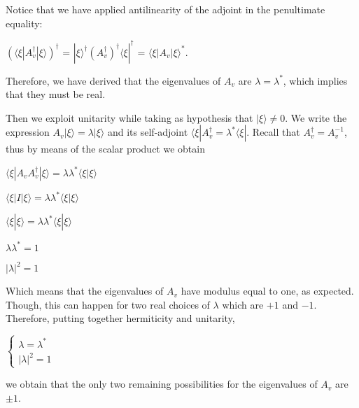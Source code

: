 \documentclass{Configuration_Files/PoliMi3i_thesis}
\begin{document}
Notice that we have applied antilinearity of the adjoint in the penultimate equality: 

\begin{center}
	$(\langle \xi|A_v^{\dagger}|\xi \rangle)^{\dagger}$ = $|\xi\rangle^{\dagger} (A_v^{\dagger})^{\dagger} \langle\xi|^{\dagger}$ = $\langle \xi|A_v|\xi \rangle^*$.  
\end{center}

Therefore, we have derived that the eigenvalues of $A_v$ are $\lambda = \lambda^*$, which implies that they must be real.


Then we exploit unitarity while taking as hypothesis that $|\xi \rangle \neq 0$. 
We write the expression $A_v |\xi \rangle = \lambda |\xi \rangle$ and its self-adjoint $\langle \xi| A_v^{\dagger} = \lambda^* \langle \xi|$. Recall that $A_v^{\dagger}=A_v^{-1}$, thus by means of the scalar product we obtain 

\begin{center}
	$\langle \xi|A_v A_v^{\dagger}|\xi\rangle = \lambda \lambda^* \langle \xi |\xi \rangle$
	
	$\langle \xi|I|\xi \rangle = \lambda \lambda^* \langle \xi |\xi \rangle$
	
	$\langle \xi|\xi \rangle = \lambda \lambda^* \langle \xi |\xi \rangle $
	
	$ \lambda \lambda^* = 1 $
	
	$ |\lambda|^2 = 1 $
\end{center}

Which means that the eigenvalues of $A_v$ have modulus equal to one, as expected. Though, this can happen for two real choices of $\lambda$ which are $+1$ and $-1$.
Therefore, putting together hermiticity and unitarity, 

\begin{center}
$\begin{cases}
	 \lambda = \lambda^* \\
	 |\lambda|^2 = 1 
\end{cases}$
\end{center}

we obtain that the only two remaining possibilities for the eigenvalues of $A_v$ are $\pm 1$. \newline
\end{document}
